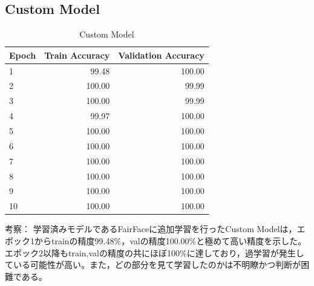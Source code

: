 \documentclass[a4paper,11pt,titlepage]{jsarticle}
\begin{document}
\subsection{Custom Model}
\begin{table}[H]
\centering
\caption{Custom Model}
\label{tab:custom}
\begin{tabular}{lrr}
\hline
 Epoch &  Train Accuracy &  Validation Accuracy \\
\hline
     1 &           99.48 &               100.00 \\
     2 &          100.00 &                99.99 \\
     3 &          100.00 &                99.99 \\
     4 &           99.97 &               100.00 \\
     5 &          100.00 &               100.00 \\
     6 &          100.00 &               100.00 \\
     7 &          100.00 &               100.00 \\
     8 &          100.00 &               100.00 \\
     9 &          100.00 &               100.00 \\
    10 &          100.00 &               100.00 \\
\hline
\end{tabular}
\end{table}
% 

考察：
学習済みモデルであるFairFaceに追加学習を行ったCustom Modelは，エポック1からtrainの精度99.48\%，valの精度100.00\%と極めて高い精度を示した。エポック2以降もtrain,valの精度の共にほぼ100\%に達しており，過学習が発生している可能性が高い。また，どの部分を見て学習したのかは不明瞭かつ判断が困難である。
\end{document}
